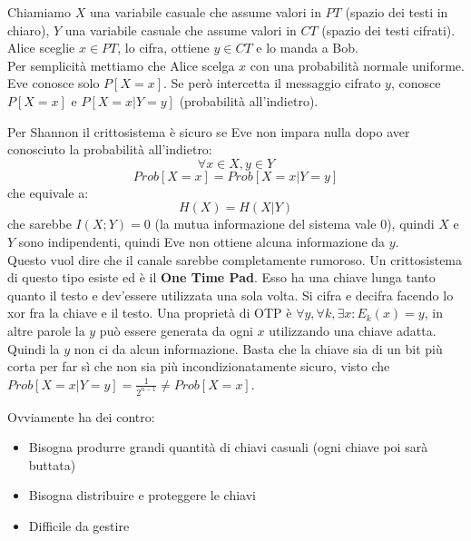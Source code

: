 Chiamiamo $X$ una variabile casuale che assume valori in $PT$ (spazio dei testi in chiaro), $Y$ una variabile casuale che assume valori in $CT$ (spazio dei testi cifrati).
Alice sceglie $x \in PT$, lo cifra, ottiene $y \in CT$ e lo manda a Bob.\\
Per semplicità mettiamo che Alice scelga $x$ con una probabilità normale uniforme.
Eve conosce solo $P[X=x]$. Se però intercetta il messaggio cifrato $y$, conosce $P[X=x]$ e $P[X=x|Y=y]$ (probabilità all'indietro).

Per Shannon il crittosistema è sicuro se Eve non impara nulla dopo aver conosciuto la probabilità all'indietro:
\begin{equation*}
\forall x \in X, y \in Y
\end{equation*}
\begin{equation*}
Prob[X=x] = Prob[X=x|Y=y]
\end{equation*}
che equivale a:
\begin{equation*}
H(X) = H(X|Y)
\end{equation*}
che sarebbe $I(X;Y) = 0$ (la mutua informazione del sistema vale 0), quindi $X$ e $Y$ sono indipendenti, quindi Eve non ottiene alcuna informazione da $y$.\\
Questo vuol dire che il canale sarebbe completamente rumoroso. Un crittosistema di questo tipo esiste ed è il \textbf{One Time Pad}.
Esso ha una chiave lunga tanto quanto il testo e dev'essere utilizzata una sola volta. Si cifra e decifra facendo lo xor fra la chiave e il testo. Una proprietà di OTP è $\forall y, \forall k, \exists x : E_k(x) = y$, in altre parole la $y$ può essere generata da ogni $x$ utilizzando una chiave adatta. Quindi la $y$ non ci da alcun informazione. Basta che la chiave sia di un bit più corta per far sì che non sia più incondizionatamente sicuro, visto che $Prob[X=x|Y=y]=\frac1{2^{n-1}} \neq Prob[X=x]$.

Ovviamente ha dei contro:
\begin{itemize}
	\item Bisogna produrre grandi quantità di chiavi casuali (ogni chiave poi sarà buttata)
	\item Bisogna distribuire e proteggere le chiavi
	\item Difficile da gestire
\end{itemize}





